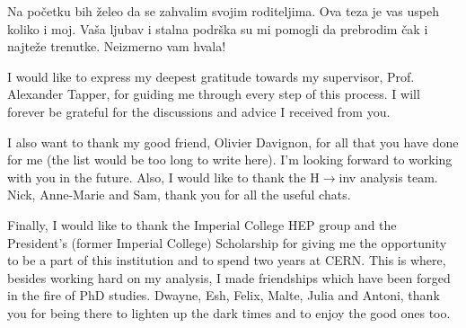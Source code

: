 
\cleardoublepage


\begin{acknowledgements}
\mediumlinespacing

\hspace{10pt} Na po\v{c}etku bih \v{z}eleo da se zahvalim svojim roditeljima. Ova teza je vas uspeh koliko i moj. Va\v{s}a ljubav i stalna podr\v{s}ka su mi pomogli da prebrodim \v{c}ak i najte\v{z}e trenutke. Neizmerno vam hvala! 

\hspace{10pt} I would like to express my deepest gratitude towards my supervisor, Prof. Alexander Tapper, for guiding me through every step of this process. I will forever be grateful for the discussions and advice I received from you.

\hspace{10pt} I also want to thank my good friend, Olivier Davignon, for all that you have done for me (the list would be too long to write here). I'm looking forward to working with you in the future. Also, I would like to thank the H$\rightarrow$inv analysis team. Nick, Anne-Marie and Sam, thank you for all the useful chats.


\hspace{10pt} Finally, I would like to thank the Imperial College HEP group and the President's (former Imperial College) Scholarship for giving me the opportunity to be a part of this institution and to spend two years at CERN. This is where, besides working hard on my analysis, I made friendships which have been forged in the fire of PhD studies. Dwayne, Esh, Felix, Malte, Julia and Antoni, thank you for being there to lighten up the dark times and to enjoy the good ones too.

\end{acknowledgements}

